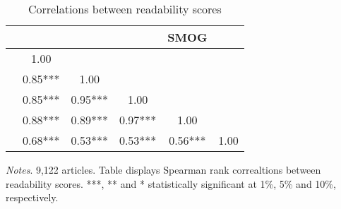 \begin{table}[H]
    \footnotesize
    \centering
    \begin{threeparttable}
        \caption{Correlations between readability scores}
        \label{tableCORR}
        \begin{tabular}{p{2.64cm}S@{}S@{}S@{}S@{}S@{}}
            \toprule
                                          &{}   &{}   &{}   &      {SMOG}   &{}   \\
            \midrule
            &        1.00   &               &               &               &               \\
             &        0.85***&        1.00   &               &               &               \\
                &        0.85***&        0.95***&        1.00   &               &               \\
                       &        0.88***&        0.89***&        0.97***&        1.00   &               \\
                 &        0.68***&        0.53***&        0.53***&        0.56***&        1.00   \\
            \bottomrule
        \end{tabular}
        \begin{tablenotes}
            \tiny
            \item \textit{Notes}. 9,122 articles. Table displays Spearman rank correaltions between readability scores. ***, ** and * statistically significant at 1\%, 5\% and 10\%, respectively.
        \end{tablenotes}
    \end{threeparttable}
\end{table}